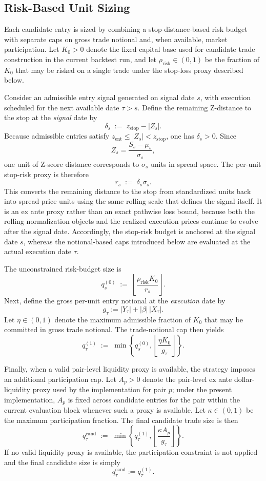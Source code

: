 \documentclass[11pt,a4paper]{article}
\begin{document}
\subsection{Risk-Based Unit Sizing}

Each candidate entry is sized by combining a stop-distance-based risk budget
with separate caps on gross trade notional and, when available, market
participation. Let \(K_0>0\) denote the fixed capital base used for candidate
trade construction in the current backtest run, and let
\(\rho_{\mathrm{risk}} \in (0,1)\) be the fraction of \(K_0\) that may be risked on a single
trade under the stop-loss proxy described below.

Consider an admissible entry signal generated on signal date \(s\), with
execution scheduled for the next available date \(\tau>s\). Define the
remaining Z-distance to the stop at the \emph{signal} date by
\[
  \delta_s
  \;:=\;
  z_{\mathrm{stop}} - |Z_s|.
\]
Because admissible entries satisfy
\(z_{\mathrm{ent}} \le |Z_s| < z_{\mathrm{stop}}\), one has \(\delta_s>0\).
Since
\[
  Z_s = \frac{S_s-\mu_s}{\sigma_s},
\]
one unit of Z-score distance corresponds to \(\sigma_s\) units in spread space.
The per-unit stop-risk proxy is therefore
\[
  r_s \;:=\; \delta_s \sigma_s.
\]
This converts the remaining distance to the stop from standardized units back
into spread-price units using the same rolling scale that defines the signal
itself. It is an ex ante proxy rather than an exact pathwise loss bound,
because both the rolling normalization objects and the realized execution prices
continue to evolve after the signal date. Accordingly, the stop-risk budget is
anchored at the signal date \(s\), whereas the notional-based caps introduced
below are evaluated at the actual execution date \(\tau\).

The unconstrained risk-budget size is
\[
  q^{(0)}_s
  \;:=\;
  \left\lfloor \frac{\rho_{\mathrm{risk}} K_0}{r_s} \right\rfloor.
\]
Next, define the gross per-unit entry notional at the \emph{execution} date by
\[
  g_\tau := |Y_\tau| + |\beta|\,|X_\tau|.
\]
Let \(\eta \in (0,1)\) denote the maximum admissible fraction of \(K_0\) that
may be committed in gross trade notional. The trade-notional cap then yields
\[
  q^{(1)}_\tau
  \;:=\;
  \min\!\left\{
    q^{(0)}_s,
    \left\lfloor \frac{\eta K_0}{g_\tau} \right\rfloor
  \right\}.
\]

Finally, when a valid pair-level liquidity proxy is available, the strategy
imposes an additional participation cap. Let \(A_p>0\) denote the pair-level
ex ante dollar-liquidity proxy used by the implementation for pair \(p\); under
the present implementation, \(A_p\) is fixed across candidate entries for the
pair within the current evaluation block whenever such a proxy is available.
Let \(\kappa \in (0,1)\) be the maximum participation fraction. The final
candidate trade size is then
\[
  q_\tau^{\mathrm{cand}}
  \;:=\;
  \min\!\left\{
    q^{(1)}_\tau,
    \left\lfloor \frac{\kappa A_p}{g_\tau} \right\rfloor
  \right\}.
\]
If no valid liquidity proxy is available, the participation constraint is not
applied and the final candidate size is simply
\[
  q_\tau^{\mathrm{cand}} := q^{(1)}_\tau.
\]
\end{document}
